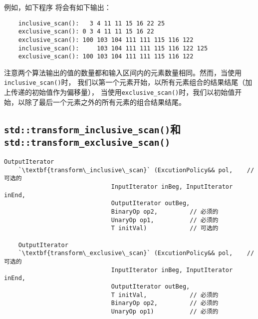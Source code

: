 例如，如下程序
将会有如下输出：
\begin{lstlisting}
    inclusive_scan():   3 4 11 11 15 16 22 25
    exclusive_scan(): 0 3 4 11 11 15 16 22
    exclusive_scan(): 100 103 104 111 111 115 116 122
    inclusive_scan():     103 104 111 111 115 116 122 125
    exclusive_scan(): 100 103 104 111 111 115 116 122
\end{lstlisting}
注意两个算法输出的值的数量都和输入区间内的元素数量相同。然而，当使用\texttt{inclusive\_scan()}时，
我们以第一个元素开始，以所有元素组合的结果结尾（加上传递的初始值作为偏移量），
当使用\texttt{exclusive\_scan()}时，我们以初始值开始，以除了最后一个元素之外的所有元素的组合结果结尾。

\subsection{\texorpdfstring{\texttt{std::transform\_inclusive\_scan()}和\\
\texttt{std::transform\_exclusive\_scan()}}{}}
\begin{lstlisting}[frame=single,xleftmargin=13pt,xrightmargin=13pt]
    OutputIterator
    `\textbf{transform\_inclusive\_scan}` (ExcutionPolicy&& pol,    // 可选的
                              InputIterator inBeg, InputIterator inEnd,
                              OutputIterator outBeg,
                              BinaryOp op2,         // 必须的
                              UnaryOp op1,          // 必须的
                              T initVal)            // 可选的

    OutputIterator
    `\textbf{transform\_exclusive\_scan}` (ExcutionPolicy&& pol,    // 可选的
                              InputIterator inBeg, InputIterator inEnd,
                              OutputIterator outBeg,
                              T initVal,            // 必须的
                              BinaryOp op2,         // 必须的
                              UnaryOp op1)          // 必须的
\end{lstlisting}
